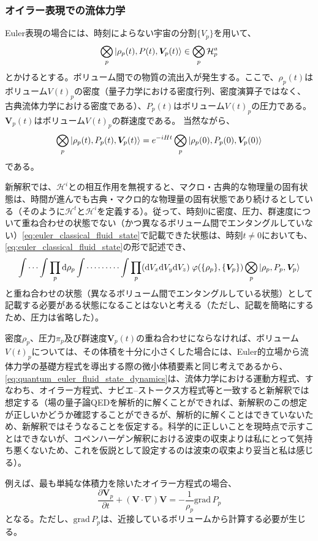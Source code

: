 \subsubsection{オイラー表現での流体力学}
Euler表現の場合には、時刻によらない宇宙の分割$\{V_p\}$を用いて、
\begin{equation}
    \label{eq:euler_classical_fluid_state}
    \bigotimes_p \ket{\rho_p(t),P(t),\bm{V}_p(t)} \in \bigotimes_p \mathcal{H}_p^a
\end{equation}
とかけるとする。ボリューム間での物質の流出入が発生する。ここで、$\rho_p(t)$はボリューム$V(t)_p$の密度（量子力学における密度行列、密度演算子ではなく、古典流体力学における密度である）、$P_p(t)$はボリューム$V(t)_p$の圧力である。$\bm{V}_p(t)$はボリューム$V(t)_p$の群速度である。
当然ながら、
\begin{equation}
    \label{eq:quantum_euler_fluid_state_dynamics}
    \bigotimes_p \ket{\rho_p(t),P_p(t),\bm{V}_p(t)} = e^{-iHt}\bigotimes_p \ket{\rho_p(0),P_p(0),\bm{V}_p(0)}
\end{equation}
である。\par
新解釈では、$\mathcal{H}^i$との相互作用を無視すると、マクロ・古典的な物理量の固有状態は、時間が進んでも古典・マクロ的な物理量の固有状態であり続けるとしている（そのように$\mathcal{H}^t$と$\mathcal{H}^i$を定義する）。従って、時刻$0$に密度、圧力、群速度について重ね合わせの状態でない（かつ異なるボリューム間でエンタングルしていない）\eqref{eq:euler_classical_fluid_state}で記載できた状態は、時刻$t \neq 0$においても、\eqref{eq:euler_classical_fluid_state}の形で記述でき、
\begin{equation}
   \int \cdots \int \prod_p \mathrm{d}\rho_p
   \int \cdots \cdots \cdots \int \prod_p (\mathrm{d}V_x \mathrm{d}V_y \mathrm{d}V_z) \; \varphi(\{\rho_p\},\{\bm{V}_p\}) \bigotimes_p \ket{\rho_p,P_p,\bm{V}_p}
\end{equation}
と重ね合わせの状態（異なるボリューム間でエンタングルしている状態）として記載する必要がある状態になることはないと考える（ただし、記載を簡略にするため、圧力は省略した）。\par
密度$\rho_p$、圧力$\pi_p$及び群速度$\bm{V}_p(t)$の重ね合わせにならなければ、ボリューム$V(t)_p$については、その体積を十分に小さくした場合には、Euler的立場から流体力学の基礎方程式を導出する際の微小体積要素と同じ考えであるから、\eqref{eq:quantum_euler_fluid_state_dynamics}は、流体力学における運動方程式、すなわち、オイラー方程式、ナビエ–ストークス方程式等と一致すると新解釈では想定する（場の量子論QEDを解析的に解くことができれば、新解釈のこの想定が正しいかどうか確認することができるが、解析的に解くことはできていないため、新解釈ではそうなることを仮定する。科学的に正しいことを現時点で示すことはできないが、コペンハーゲン解釈における波束の収束よりは私にとって気持ち悪くないため、これを仮説として設定するのは波束の収束より妥当と私は感じる）。\par
例えば、最も単純な体積力を除いたオイラー方程式の場合、
\begin{equation}
    \frac{\partial{\bm{V}_p}}{\partial t} + (\bm{V}\cdot \nabla) \bm{V} = -\frac{1}{\rho_p } \mathrm{grad}\, P_p
\end{equation}
となる。ただし、$\mathrm{grad}\,P_p$は、近接しているボリュームから計算する必要が生じる。